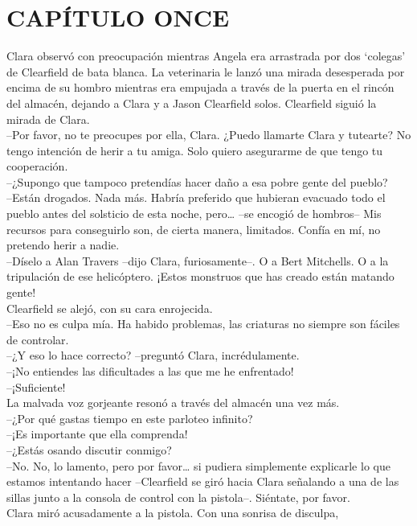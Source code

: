 \chapter*{CAPÍTULO ONCE}
Clara observó con preocupación mientras Angela era arrastrada por dos
`colegas' de Clearfield de bata blanca. La veterinaria le lanzó una
mirada desesperada por encima de su hombro mientras era empujada a
través de la puerta en el rincón del almacén, dejando a Clara y a Jason
Clearfield solos. Clearfield siguió la mirada de Clara.\\
--Por favor, no te preocupes por ella, Clara. ¿Puedo llamarte Clara y
tutearte? No tengo intención de herir a tu amiga. Solo quiero asegurarme
de que tengo tu cooperación.\\
--¿Supongo que tampoco pretendías hacer daño a esa pobre gente del
pueblo?\\
--Están drogados. Nada más. Habría preferido que hubieran evacuado todo
el pueblo antes del solsticio de esta noche, pero\ldots{} --se encogió
de hombros-- Mis recursos para conseguirlo son, de cierta manera,
limitados. Confía en mí, no pretendo herir a nadie.\\
--Díselo a Alan Travers --dijo Clara, furiosamente--. O a Bert
Mitchells. O a la tripulación de ese helicóptero. ¡Estos monstruos que
has creado están matando gente!\\
Clearfield se alejó, con su cara enrojecida.\\
--Eso no es culpa mía. Ha habido problemas, las criaturas no siempre son
fáciles de controlar.\\
--¿Y eso lo hace correcto? --preguntó Clara, incrédulamente.\\
--¡No entiendes las dificultades a las que me he enfrentado!\\
--¡Suficiente!\\
La malvada voz gorjeante resonó a través del almacén una vez más.\\
--¿Por qué gastas tiempo en este parloteo infinito?\\
--¡Es importante que ella comprenda!\\
--¿Estás osando discutir conmigo?\\
--No. No, lo lamento, pero por favor\ldots{} si pudiera simplemente
explicarle lo que estamos intentando hacer --Clearfield se giró hacia
Clara señalando a una de las sillas junto a la consola de control con la
pistola--. Siéntate, por favor.\\
Clara miró acusadamente a la pistola. Con una sonrisa de disculpa,
